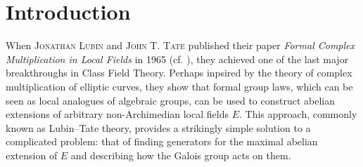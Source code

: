 \documentclass[../main.tex]{subfiles}
\begin{document}
\section*{Introduction} %

When \textsc{Jonathan Lubin} and \textsc{John T. Tate} published their
paper \textit{Formal Complex Multiplication in Local Fields} in 1965 (cf.
\cite{LubinTateFormalMult}), they achieved one of the last major breakthroughs
in Class Field Theory. Perhaps inpsired by the theory of complex multiplication
of elliptic curves, they show that formal group laws, which can be seen as local
analogues of algebraic groups, can be used to construct abelian extensions of
arbitrary non-Archimedian local fields $E$. This approach, commonly known as Lubin--Tate theory, provides a strikingly simple solution to a
complicated problem: that of finding generators for the maximal abelian
extension of $E$ and describing how the Galois group acts on them. 
\end{document}
